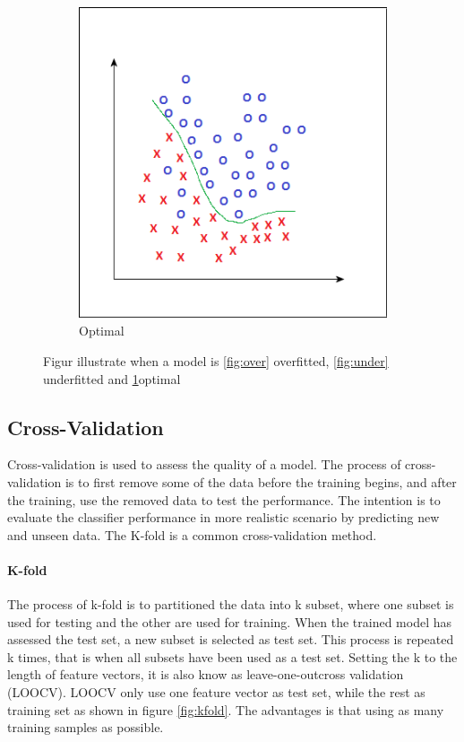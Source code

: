 \documentclass[USenglish]{ifimaster}  %
\begin{document}
\begin{figure}[h]
\begin{subfigure}{\linewidth}
		\includegraphics[scale=0.43]{Figures/Finefitting}
		\caption{Optimal}
		\label{fig:optimal}
	\end{subfigure}
	\caption{Figur illustrate when a model is \ref{fig:over} overfitted, \ref{fig:under} underfitted and \ref{fig:optimal}optimal }
	\label{fig:fitting}	
\end{figure}

\FloatBarrier

\subsection{Cross-Validation}
Cross-validation is used to assess the quality of a model. The process of cross-validation is to first remove some of the data before the training begins, and after the training, use the removed data to test the performance. The intention is to evaluate the classifier performance in more realistic scenario by predicting new and unseen data. The K-fold is a common cross-validation method.

\paragraph{K-fold}
The process of k-fold is to partitioned the data into k subset, where one subset is used for testing and the other are used for training. When the trained model has assessed the test set, a new subset is selected as test set. This process is repeated k times, that is when all subsets have been used as a test set. Setting the k to the length of feature vectors, it is also know as leave-one-outcross validation (LOOCV). LOOCV only use one feature vector as test set, while the rest as training set as shown in figure \ref{fig:kfold}. The advantages is that using as many training samples as possible.
\end{document}
